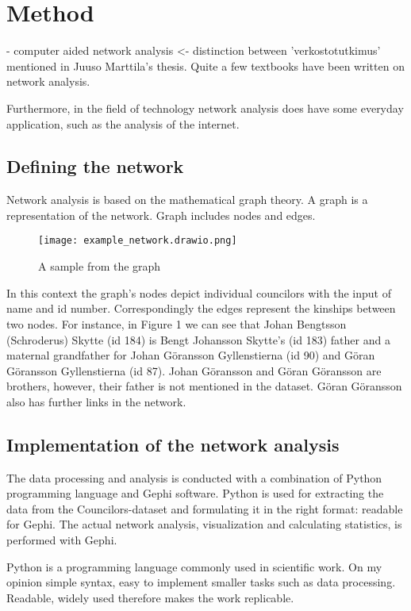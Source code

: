 \documentclass[a4paper,12pt]{article}
\begin{document}
\section{Method}
- computer aided network analysis <- distinction between 'verkostotutkimus' mentioned in Juuso Marttila's thesis. 
Quite a few textbooks have been written on network analysis.

Furthermore, in the field of technology network analysis does have some everyday application, such as the analysis of the internet. 

\subsection{Defining the network}
Network analysis is based on the mathematical graph theory. A graph is a representation of the network. Graph includes nodes and edges.

\begin{figure}[h]
	\texttt{[image: example\_network.drawio.png]}
	\centering
	\caption{A sample from the graph} 
	\centering
\end{figure}
In this context the graph's nodes depict individual councilors with the input of name and id number. Correspondingly the edges represent the kinships between two nodes. For instance, in Figure 1 we can see that Johan Bengtsson (Schroderus) Skytte (id 184) is Bengt Johansson Skytte's (id 183) father and a maternal grandfather for Johan Göransson Gyllenstierna (id 90) and Göran Göransson Gyllenstierna (id 87). Johan Göransson and Göran Göransson are brothers, however, their father is not mentioned in the dataset. Göran Göransson also has further links in the network.  

\subsection{Implementation of the network analysis}
The data processing and analysis is conducted with a combination of Python programming language and Gephi software. Python is used for extracting the data from the Councilors-dataset and formulating it in the right format: readable for Gephi. The actual network analysis, visualization and calculating statistics, is performed with Gephi. 

Python is a programming language commonly used in scientific work.
On my opinion simple syntax, easy to implement smaller tasks such as data processing. Readable, widely used therefore makes the work replicable. 
\end{document}
